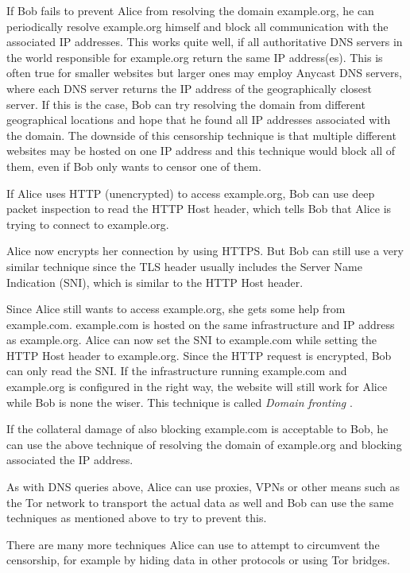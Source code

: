 If Bob fails to prevent Alice from resolving the domain example.org, he can periodically resolve example.org himself and block all communication with the associated IP addresses.
This works quite well, if all authoritative DNS servers in the world responsible for example.org return the same IP address(es).
This is often true for smaller websites but larger ones may employ Anycast DNS servers, where each DNS server returns the IP address of the geographically closest server.
If this is the case, Bob can try resolving the domain from different geographical locations and hope that he found all IP addresses associated with the domain.
The downside of this censorship technique is that multiple different websites may be hosted on one IP address and this technique would block all of them, even if Bob only wants to censor one of them.

If Alice uses HTTP (unencrypted) to access example.org, Bob can use deep packet inspection to read the HTTP Host header, which tells Bob that Alice is trying to connect to example.org.

Alice now encrypts her connection by using HTTPS. But Bob can still use a very similar technique since the TLS header usually includes the Server Name Indication (SNI), which is similar to the HTTP Host header.

Since Alice still wants to access example.org, she gets some help from example.com.
example.com is hosted on the same infrastructure and IP address as example.org.
Alice can now set the SNI to example.com while setting the HTTP Host header to example.org.
Since the HTTP request is encrypted, Bob can only read the SNI.
If the infrastructure running example.com and example.org is configured in the right way, the website will still work for Alice while Bob is none the wiser.
This technique is called \textit{Domain fronting} \cite{wiki:Domain_fronting}.

If the collateral damage of also blocking example.com is acceptable to Bob, he can use the above technique of resolving the domain of example.org and blocking associated the IP address.

As with DNS queries above, Alice can use proxies, VPNs or other means such as the Tor network to transport the actual data as well and Bob can use the same techniques as mentioned above to try to prevent this.

There are many more techniques Alice can use to attempt to circumvent the censorship, for example by hiding data in other protocols or using Tor bridges.

